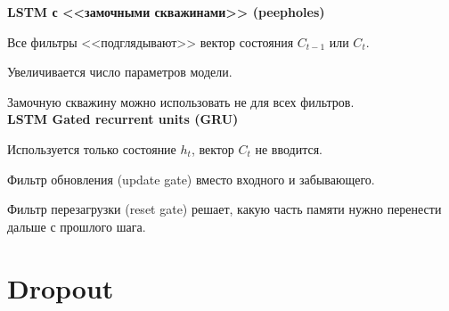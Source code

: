 \documentclass[11pt, oneside]{article}   	%
\begin{document}
	
	\textbf{LSTM с <<замочными скважинами>> (peepholes)}
	
	\begin{figure}[h]
	\end{figure}
	
	Все фильтры <<подглядывают>> вектор состояния $C_{t-1}$ или $C_t$.
	
	\medskip
	
	Увеличивается число параметров модели.
	
	\medskip
	
	Замочную скважину можно использовать не для всех фильтров.\\
	
	\textbf{LSTM Gated recurrent units (GRU)}
	
	\begin{figure}[h]
	\end{figure}
	
	Используется только состояние $h_t$, вектор $C_t$ не вводится.
	
	\medskip
	
	Фильтр обновления (update gate) вместо входного и забывающего.
	
	\medskip
	
	Фильтр перезагрузки (reset gate) решает, какую часть памяти нужно перенести дальше с прошлого шага.
	
	
	
	\section{Dropout}
	
\end{document}
